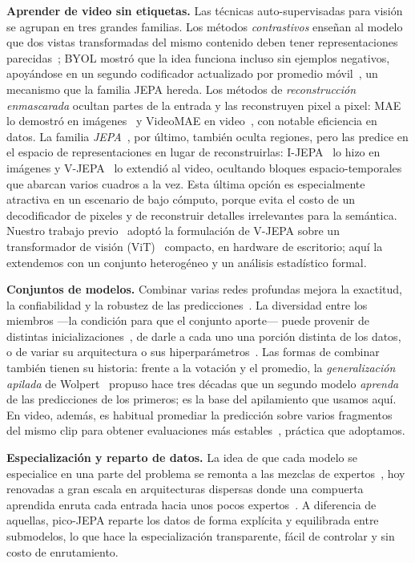 \documentclass[runningheads]{llncs}
\begin{document}
\textbf{Aprender de video sin etiquetas.} Las técnicas auto-supervisadas para
visión se agrupan en tres grandes familias. Los métodos \emph{contrastivos}
enseñan al modelo que dos vistas transformadas del mismo contenido deben tener
representaciones parecidas~\cite{chen2020simple}; BYOL mostró que la idea
funciona incluso sin ejemplos negativos, apoyándose en un segundo codificador
actualizado por promedio móvil~\cite{grill2020bootstrap}, un mecanismo que la
familia JEPA hereda. Los métodos de \emph{reconstrucción enmascarada} ocultan
partes de la entrada y las reconstruyen pixel a pixel: MAE lo demostró en
imágenes~\cite{he2022masked} y VideoMAE en video~\cite{tong2022videomae}, con
notable eficiencia en datos. La familia \emph{JEPA}~\cite{lecun2022path}, por
último, también oculta regiones, pero las predice en el espacio de
representaciones en lugar de reconstruirlas: I-JEPA~\cite{assran2023self} lo
hizo en imágenes y V-JEPA~\cite{bardes2024revisiting} lo extendió al video,
ocultando bloques espacio-temporales que abarcan varios cuadros a la vez. Esta
última opción es especialmente atractiva en un escenario de bajo cómputo, porque
evita el costo de un decodificador de pixeles y de reconstruir detalles
irrelevantes para la semántica. Nuestro trabajo previo~\cite{rostagno2025pico}
adoptó la formulación de V-JEPA sobre un transformador de visión
(ViT)~\cite{dosovitskiy2021image} compacto, en hardware de escritorio; aquí la
extendemos con un conjunto heterogéneo y un análisis estadístico formal.

\textbf{Conjuntos de modelos.} Combinar varias redes profundas mejora la
exactitud, la confiabilidad y la robustez de las
predicciones~\cite{dietterich2000ensemble,lakshminarayanan2017simple}. La
diversidad entre los miembros ---la condición para que el conjunto aporte---
puede provenir de distintas inicializaciones~\cite{fort2019deep}, de darle a
cada uno una porción distinta de los datos, o de variar su arquitectura o sus
hiperparámetros~\cite{wenzel2020hyperparameter}. Las formas de combinar también
tienen su historia: frente a la votación y el promedio, la \emph{generalización
apilada} de Wolpert~\cite{wolpert1992stacked} propuso hace tres décadas que un
segundo modelo \emph{aprenda} de las predicciones de los primeros; es la base
del apilamiento que usamos aquí. En video, además, es habitual promediar la
predicción sobre varios fragmentos del mismo clip para obtener evaluaciones más
estables~\cite{wang2018temporal}, práctica que adoptamos.

\textbf{Especialización y reparto de datos.} La idea de que cada modelo se
especialice en una parte del problema se remonta a las mezclas de
expertos~\cite{jacobs1991adaptive}, hoy renovadas a gran escala en arquitecturas
dispersas donde una compuerta aprendida enruta cada entrada hacia unos pocos
expertos~\cite{shazeer2017outrageously}. A diferencia de aquellas, pico-JEPA
reparte los datos de forma explícita y equilibrada entre submodelos, lo que hace
la especialización transparente, fácil de controlar y sin costo de enrutamiento.
\end{document}

